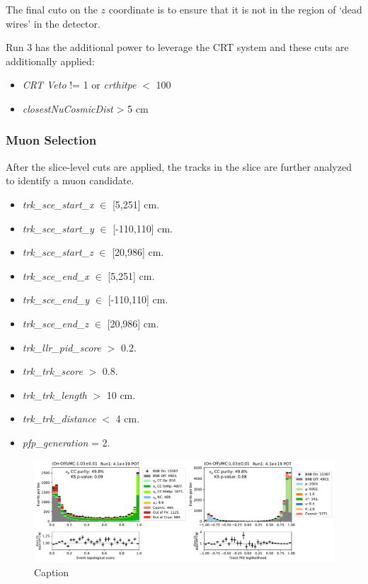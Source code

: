 \par The final cuto on the $z$ coordinate is to ensure that it is not in the region of `dead wires' in the detector.

\par Run 3 has the additional power to leverage the CRT system and these cuts are additionally applied:

\begin{itemize}
    \item \emph{CRT Veto} != 1 or \emph{crthitpe} $<$ 100
    \item \emph{closestNuCosmicDist} > 5 cm
\end{itemize}

\subsubsection{Muon Selection}
\label{sssec:NuMUCCsel:sel:muonsel}

\par After the slice-level cuts are applied, the tracks in the slice are further analyzed to identify a muon candidate.

\begin{itemize}
    \item \emph{trk\_sce\_start\_x} $\in$ [5,251] cm.
    \item \emph{trk\_sce\_start\_y} $\in$ [-110,110] cm.
    \item \emph{trk\_sce\_start\_z} $\in$ [20,986] cm.
    \item \emph{trk\_sce\_end\_x} $\in$ [5,251] cm.
    \item \emph{trk\_sce\_end\_y} $\in$ [-110,110] cm.
    \item \emph{trk\_sce\_end\_z} $\in$ [20,986] cm.
    \item \emph{trk\_llr\_pid\_score} $>$ 0.2.
    \item \emph{trk\_trk\_score} $>$ 0.8.
    \item \emph{trk\_trk\_length} $>$ 10 cm.
    \item \emph{trk\_trk\_distance} $<$ 4 cm.
    \item \emph{pfp\_generation} = 2.
\end{itemize}

\begin{figure}
    \centering
    \includegraphics[width=\textwidth]{NuMuCCsel/Images/run1/numu_pret_run1.pdf}
    \caption{Caption}
    \label{fig:numu_topo_pid}
\end{figure}


